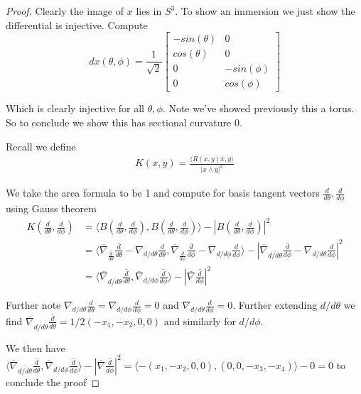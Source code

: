\documentclass[11pt]{article}
\begin{document}
\begin{proof}
	
	Clearly the image of $x$ lies in $S^3$. To show an immersion we just show the differential is injective. Compute
	\[
		dx(\theta,\phi) = 
		\frac{1}{\sqrt{2}}
		\begin{bmatrix}
			-sin(\theta) & 0 \\
			cos(\theta) & 0 \\
			0 & -sin(\phi) \\
			0 & cos(\phi)
		\end{bmatrix}
	\]

	Which is clearly injective for all $\theta,\phi$. Note we've showed previously this a torus. So to conclude we show this has sectional curvature 0.

	Recall we define 
	\begin{align*}
		K(x,y) = \frac{\langle R(x,y)x,y\rangle}{|x \wedge y|^2}
	\end{align*}

	We take the area formula to be 1 and compute for basis tangent vectors $\frac{d}{d\theta},\frac{d}{d\phi}$ using Gauss theorem
	\begin{align*}
		K(\frac{d}{d\theta},\frac{d}{d\phi}) &= \langle B(\frac{d}{d\theta},\frac{d}{d\phi}), B(\frac{d}{d\theta},\frac{d}{d\phi}) \rangle - |B(\frac{d}{d\theta},\frac{d}{d\phi})|^2 \\
		&= \langle \overline{\nabla}_{\overline{\frac{d}{d\theta}}} \overline{\frac{d}{d\theta}} - \nabla_{d/d\theta}\frac{d}{d\theta},\overline{\nabla}_{\overline{\frac{d}{d\phi}}} \overline{\frac{d}{d\phi}} - \nabla_{d/d\phi}\frac{d}{d\phi} \rangle - |\overline{\nabla}_{\overline{d/d\theta}} \overline{\frac{d}{d\phi}} - \nabla_{d/d\theta} \frac{d}{d\phi}|^2\\
		&= \langle \overline{\nabla}_{\overline{d/d\theta}} \overline{\frac{d}{d\theta}}, \overline{\nabla}_{d/d\phi}\overline{\frac{d}{d\phi}}\rangle - |\overline{\nabla} \overline{\frac{d}{d\phi}}|^2
	\end{align*}

	Further note $\nabla_{d/d\theta} \frac{d}{d\theta} = \nabla_{d/d\phi}\frac{d}{d\phi} = 0$ and $\nabla_{d/d\theta}\frac{d}{d\phi} = 0$. Further extending $d/d\theta$ we find $\overline{\nabla}_{\overline{d/d\theta}}\overline{\frac{d}{d\theta}} = 1/2 (-x_1,-x_2,0,0)$ and similarly for $d/d\phi$. 

	We then have $\langle \overline{\nabla}_{\overline{d/d\theta}} \overline{\frac{d}{d\theta}}, \overline{\nabla}_{d/d\phi}\overline{\frac{d}{d\phi}}\rangle - |\overline{\nabla} \overline{\frac{d}{d\phi}}|^2 = \langle -(x_1,-x_2,0,0),(0,0,-x_3,-x_4) \rangle -0 = 0$ to conclude the proof

\end{proof}
\end{document}
